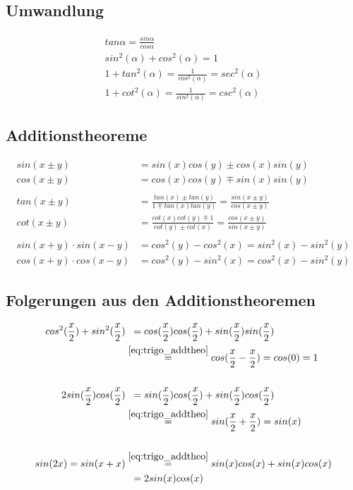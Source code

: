 \documentclass[12pt,a4paper]{report}%
\numberwithin{equation}{section}
\numberwithin{equation}{subsection}
\begin{document}
	  \subsection{Umwandlung}
	  \begin{align}
	    tan\alpha = \frac{sin\alpha}{cos\alpha}\\
	    sin^2(\alpha) + cos^2(\alpha) = 1\\
	    1 + tan^2(\alpha) = \frac{1}{cos^2(\alpha)} = sec^2(\alpha)\\
	    1 + cot^2(\alpha) = \frac{1}{sin^2(\alpha)} = csc^2(\alpha)\label{eq:trigo_umwandlung}
	  \end{align}
	  
	  \subsection{Additionstheoreme}
	  \begin{align}
	    sin(x \pm y) &= sin(x) cos(y) \pm cos(x) sin(y)\\
	    cos(x \pm y) &= cos(x) cos(y) \mp sin(x) sin(y)\\\\
	    tan(x \pm y) &= \frac{tan(x) \pm tan(y)}{1 \mp tan(x) tan(y)} = \frac{sin(x \pm y)}{cos(x \pm y)}\\
	    cot(x \pm y) &= \frac{cot(x) cot(y) \mp 1}{cot(y) \pm cot(x)} = \frac{cos(x \pm y)}{sin(x \pm y)}\\\\
	    sin(x + y) \cdot sin(x - y) &= cos^2(y) - cos^2(x) = sin^2(x) - sin^2(y)\\
	    cos(x + y) \cdot cos(x - y) &= cos^2(y) - sin^2(x) = cos^2(x) - sin^2(y)\label{eq:trigo_addtheo}
	  \end{align}
	  
	  \subsection{Folgerungen aus den Additionstheoremen}
	  \begin{align}
	  cos^2(\frac{x}{2}) + sin^2(\frac{x}{2}) &\;\;= cos(\frac{x}{2}) cos(\frac{x}{2}) + sin(\frac{x}{2}) sin(\frac{x}{2})\\ 
	  &\overset{\eqref{eq:trigo_addtheo}}{=} cos(\frac{x}{2}-\frac{x}{2}) = cos(0) = 1\\
	  \\
	  2sin(\frac{x}{2})cos(\frac{x}{2}) &\;\;= sin(\frac{x}{2})cos(\frac{x}{2}) + sin(\frac{x}{2})cos(\frac{x}{2})\\
	  &\overset{\eqref{eq:trigo_addtheo}}{=} sin(\frac{x}{2}+ \frac{x}{2}) = sin(x)\\
	  \\
	  sin(2x) = sin(x+x) &\overset{\eqref{eq:trigo_addtheo}}{=} sin(x)cos(x) + sin(x)cos(x) \\
	  &\;\;=2sin(x)cos(x) \label{eq:trigo:addtheo_folg}
	  \end{align}
	  \newpage
\end{document}
